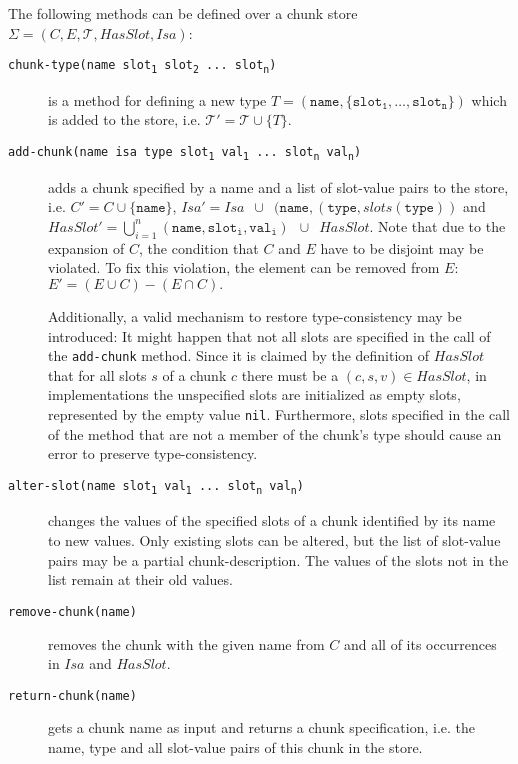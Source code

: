 \begin{definition}
\label{def:abstract_methods_chunk_store}
The following methods can be defined over a chunk store $\Sigma = (C, E, \mathcal{T}, HasSlot, Isa)$:

\begin{description}
 \item[\texttt{chunk-type(name slot\textsubscript{1} slot\textsubscript{2} ... slot\textsubscript{n})}] is a method for defining a new type $T = (\mathtt{name},\{\mathtt{slot_1}, \dots, \mathtt{slot_n}\})$ which is added to the store, i.e. $\mathcal{T'} = \mathcal{T} \cup \{T\}$. 
 \item[\texttt{add-chunk(name isa type slot\textsubscript{1} val\textsubscript{1} ... slot\textsubscript{n} val\textsubscript{n})}] adds a chunk specified by a name and a list of slot-value pairs to the store, i.e. $C' = C \cup \{ \mathtt{name} \}$, $Isa' = Isa \enspace \cup \enspace (\mathtt{name}, (\mathtt{type}, slots(\mathtt{type}))$ and $HasSlot' = \bigcup_{i = 1}^n{\mathtt{(name,slot_i,val_i)}} \enspace \cup \enspace HasSlot.$ Note that due to the expansion of $C$, the condition that $C$ and $E$ have to be disjoint may be violated. To fix this violation, the element can be removed from $E$: $E' = (E \cup C) - (E \cap C).$ 
 
 Additionally, a valid mechanism to restore type-consistency may be introduced: It might happen that not all slots are specified in the call of the \lstinline|add-chunk| method. Since it is claimed by the definition of $HasSlot$ that for all slots $s$ of a chunk $c$ there must be a $(c,s,v) \in HasSlot$, in implementations the unspecified slots are initialized as empty slots, represented by the empty value \lstinline|nil|. Furthermore, slots specified in the call of the method that are not a member of the chunk's type should cause an error to preserve type-consistency.
  \item[\texttt{alter-slot(name slot\textsubscript{1} val\textsubscript{1} ... slot\textsubscript{n} val\textsubscript{n})}] changes the values of the specified slots of a chunk identified by its name to new values. Only existing slots can be altered, but the list of slot-value pairs may be a partial chunk-description. The values of the slots not in the list remain at their old values.
  \item[\texttt{remove-chunk(name)}] removes the chunk with the given name from $C$ and all of its occurrences in $Isa$ and $HasSlot$.
  \item[\texttt{return-chunk(name)}] gets a chunk name as input and returns a chunk specification, i.e. the name, type and all slot-value pairs of this chunk in the store.
\end{description} 
\end{definition}


